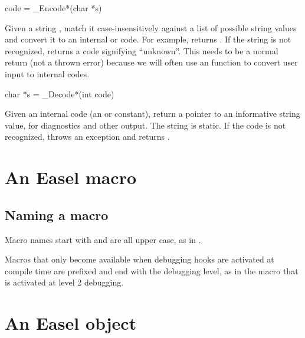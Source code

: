 \begin{sreapi}
\hypertarget{ifc:Encode}
{\item[code = \_Encode*(char *s)]}

Given a string , match it case-insensitively against a list
of possible string values and convert it to an internal
 or  code. For example,
 returns
. If the string is not recognized, returns a
code signifying ``unknown''. This needs to be a normal return (not a
thrown error) because we will often use an  function to
convert user input to internal codes.

\hypertarget{ifc:Decode}
{\item[char *s = \_Decode*(int code)]}

Given an internal code (an  or  constant),
return a pointer to an informative string value, for diagnostics and
other output. The string is static. If the code is not recognized,
throws an  exception and returns .

\end{sreapi}




\section{An Easel macro}

   \subsection{Naming a macro}

Macro names start with  and are all upper case, as in
.

Macros that only become available when debugging hooks are activated
at compile time are prefixed and end with the debugging
level, as in the  macro that is activated at
level 2 debugging.

\section{An Easel object}

